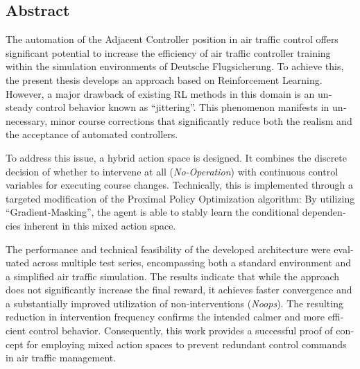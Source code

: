 

\begin{otherlanguage}{american}
	\chapter*{Abstract}
The automation of the Adjacent Controller position in air traffic control offers significant potential to increase the efficiency of air traffic controller training within the simulation environments of Deutsche Flugsicherung. To achieve this, the present thesis develops an approach based on Reinforcement Learning. However, a major drawback of existing \ac{RL} methods in this domain is an unsteady control behavior known as \enquote{jittering}. This phenomenon manifests in unnecessary, minor course corrections that significantly reduce both the realism and the acceptance of automated controllers.
\medskip

To address this issue, a hybrid action space is designed. It combines the discrete decision of whether to intervene at all (\emph{No-Operation}) with continuous control variables for executing course changes. Technically, this is implemented through a targeted modification of the Proximal Policy Optimization algorithm: By utilizing \enquote{Gradient\hyp{}Masking}, the agent is able to stably learn the conditional dependencies inherent in this mixed action space.
\medskip

The performance and technical feasibility of the developed architecture were evaluated across multiple test series, encompassing both a standard environment and a simplified air traffic simulation. The results indicate that while the approach does not significantly increase the final reward, it achieves faster convergence and a substantially improved utilization of non\hyp{}interventions (\emph{Noops}). The resulting reduction in intervention frequency confirms the intended calmer and more efficient control behavior. Consequently, this work provides a successful proof of concept for employing mixed action spaces to prevent redundant control commands in air traffic management.

\end{otherlanguage}
